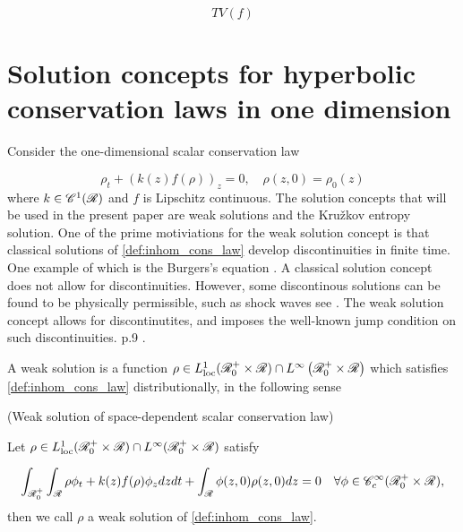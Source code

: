 \begin{definition}
\begin{equation}
TV(f)     
\end{equation}
\fi 

\section{Solution concepts for hyperbolic conservation laws in one dimension}

Consider the one-dimensional scalar conservation law 

\begin{equation} \label{def:inhom_cons_law}
	\rho_t + (k(z)f(\rho))_z = 0,\quad \rho(z,0) = \rho_0(z)
\end{equation}
where $k \in \mathscr{C}^1(\mathscr{R})$ and $f$ is Lipschitz continuous. 
The solution concepts that will be used in the present paper are weak solutions and the Kružkov entropy solution. One of the prime motiviations for the weak solution concept is that classical solutions of \eqref{def:inhom_cons_law} develop discontinuities in finite time. One example of which is the Burgers's equation \cite[exampel 1.3][p.5]{holden2015front}. A classical solution concept does not allow for discontinuities. However, some discontinous solutions can be found to be physically permissible, such as shock waves see \cite[example1.4, p]{holden2015front}. The weak solution concept allows for discontinutites, and imposes the well-known jump condition on such discontinuities. p.9 \cite{holden2015front}. 

A weak solution is a function $\rho \in L^1_{\text{loc}}(\mathscr{R}^+_0 \times \mathscr{R}) \cap L^\infty\left(\mathscr{R}^+_0 \times \mathscr{R}\right)$ which satisfies \eqref{def:inhom_cons_law} distributionally, in the following sense 

\begin{definition}(Weak solution of space-dependent scalar conservation law)\label{def:weak_solution}
	
	Let $\rho \in L_{\text{loc}}^1(\mathscr{R}^+_0 \times \mathscr{R}) \cap L^\infty(\mathscr{R}^+_0 \times \mathscr{R})$ satisfy
	
	\begin{equation} \label{def}
		\int_{\mathscr{R}_0^+}\int_{\mathscr{R}} \rho \phi_t + k(z) f(\rho) \phi_z dz dt + \int_{\mathscr{R}} \phi(z,0) \rho(z,0) dz= 0 \quad \forall \phi \in \mathscr{C}^\infty_c(\mathscr{R}^+_0 \times \mathscr{R}),
	\end{equation}
	then we call $\rho$ a weak solution of \eqref{def:inhom_cons_law}. 
\end{definition} 


\end{definition}
